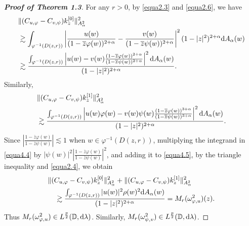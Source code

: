 \documentclass[preprint,12pt,times]{elsarticle}
\theoremstyle{definition}
\theoremstyle{remark}
\numberwithin{equation}{section}
\begin{document}
\begin{proof}[{\bf Proof of Theorem 1.3}]
For any $r>0$, by \eqref{equa2.3} and \eqref{equa2.6}, we have
\begin{equation}\label{equa4.4}
\begin{split}
&\|(C_{u,\varphi}-C_{v,\psi})k_z^{[0]}\|_{A_{\alpha}^2}^2\\
&\gtrsim\int_{\varphi^{-1}(D(z,r))}\left|\frac{u(w)}{(1-\overline{z}\varphi(w))^{2+\alpha}}-
\frac{v(w)}{(1-\overline{z}\psi(w))^{2+\alpha}}\right|^2(1-|z|^2)^{2+\alpha}{\rm d}A_{\alpha}(w)\\
&\gtrsim \frac{\int_{\varphi^{-1}(D(z,r))}\left|u(w)-v(w)\frac{(1-\overline{z}\varphi(w))^{2+\alpha}}{(1-\overline{z}\psi(w))^{2+\alpha}}\right|^2{\rm d}A_{\alpha}(w)}{(1-|z|^2)^{2+\alpha}}.
\end{split}
\end{equation}
Similarly,
\begin{equation}\label{equa4.5}
\begin{split}
&\|(C_{u,\varphi}-C_{v,\psi})k_z^{[1]}\|_{A_{\alpha}^2}^2\\
&\gtrsim\frac{\int_{\varphi^{-1}(D(z,r))}\left|u(w)\varphi(w)-v(w)\psi(w)\frac{(1-\overline{z}\varphi(w))^{3+\alpha}}{(1-\overline{z}\psi(w))^{3+\alpha}}\right|^2{\rm d}A_{\alpha}(w)}{(1-|z|^2)^{2+\alpha}}.
\end{split}
\end{equation}
Since $\left|\frac{1-\overline{z}\varphi(w)}{1-\overline{z}\psi(w)}\right|\lesssim 1$ when $w\in \varphi^{-1}(D(z,r))$, multiplying the integrand in \eqref{equa4.4} by $|\psi(w)|^2\left|\frac{1-\overline{z}\varphi(w)}{1-\overline{z}\psi(w)}\right|^2$, and adding it to \eqref{equa4.5}, by the triangle inequality and \eqref{equa2.4}, we obtain
\begin{equation}\label{equa4.6}
\begin{split}
&\|(C_{u,\varphi}-C_{v,\psi})k_z^{[0]}\|_{A_{\alpha}^2}^2+\|(C_{u,\varphi}-C_{v,\psi})k_z^{[1]}\|_{A_{\alpha}^2}^2\\
&\quad \gtrsim\frac{\int_{\varphi^{-1}(D(z,r))}|u(w)|^2\rho(w)^2{\rm d}A_{\alpha}(w)}{(1-|z|^2)^{2+\alpha}}=M_r(\omega_{\varphi,u}^2)(z).
\end{split}
\end{equation}
Thus $M_r(\omega_{\varphi,u}^2)\in L^{\frac{p}{2}}(\mathbb{D},{\rm d}\lambda)$. Similarly, $M_r(\omega_{\psi,v}^2)\in L^{\frac{p}{2}}(\mathbb{D},{\rm d}\lambda)$.


\end{proof}
\end{document}
